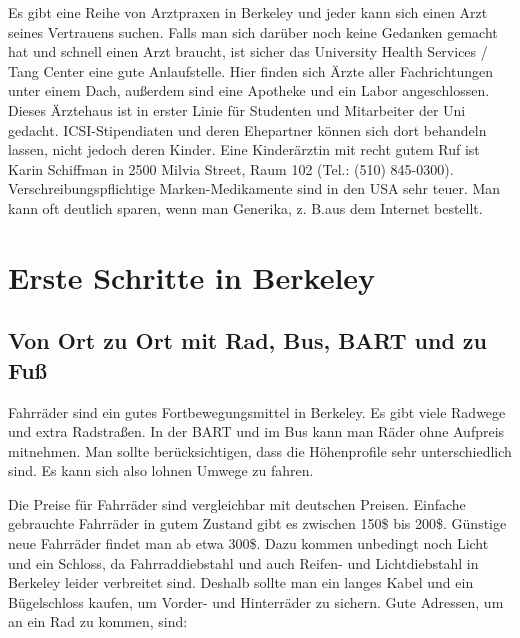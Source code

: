 \documentclass[a4paper]{scrreprt}
\begin{document}
Es gibt eine Reihe von Arztpraxen in Berkeley und jeder kann sich einen Arzt seines Vertrauens suchen. Falls man sich darüber noch keine Gedanken gemacht hat und schnell einen Arzt braucht, ist sicher das University Health Services / Tang Center eine gute Anlaufstelle. Hier finden sich Ärzte aller Fachrichtungen unter einem Dach, außerdem sind eine Apotheke und ein Labor angeschlossen. Dieses Ärztehaus ist in erster Linie für Studenten und Mitarbeiter der Uni gedacht. ICSI-Stipendiaten und deren Ehepartner können sich dort behandeln lassen, nicht jedoch deren Kinder.
Eine Kinderärztin mit recht gutem Ruf ist Karin Schiffman in 2500 Milvia Street, Raum 102 (Tel.: (510) 845-0300). Verschreibungspflichtige Marken-Medikamente sind in den USA sehr teuer. Man kann oft deutlich sparen, wenn man Generika, z. B.aus dem Internet bestellt.
 
\chapter{Erste Schritte in Berkeley}

\section{Von Ort zu Ort mit Rad, Bus, BART und zu Fuß}

Fahrräder sind ein gutes Fortbewegungsmittel in Berkeley. Es gibt
viele Radwege und extra Radstraßen. In der BART und im Bus kann man
Räder ohne Aufpreis mitnehmen. Man sollte berücksichtigen, dass die
Höhenprofile sehr unterschiedlich sind. Es kann sich also lohnen
Umwege zu fahren.

Die Preise für Fahrräder sind vergleichbar mit deutschen
Preisen. Einfache gebrauchte Fahrräder in gutem Zustand gibt es
zwischen 150\$ bis 200\$. Günstige neue Fahrräder findet man ab etwa
300\$. Dazu kommen unbedingt noch Licht und ein Schloss, da
Fahrraddiebstahl und auch Reifen- und Lichtdiebstahl in Berkeley
leider verbreitet sind. Deshalb sollte man ein langes Kabel und ein
Bügelschloss kaufen, um Vorder- und Hinterräder zu sichern. Gute
Adressen, um an ein Rad zu kommen, sind:
\end{document}
